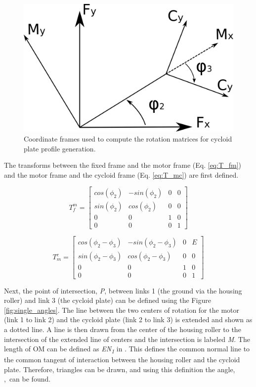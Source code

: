\begin{figure}[!b]
   \centering
   \includegraphics[width=0.50\linewidth]{fig/single_stage_frames}
   \caption{Coordinate frames used to compute the rotation matrices for cycloid plate profile generation.}
   \label{fig:single_frames}
\end{figure}

The transforms between the fixed frame and the motor frame (Eq. \ref{eq:T_fm}) and the motor frame and the cycloid frame (Eq. \ref{eq:T_mc}) are first defined. 

\begin{equation} \label{eq:T_fm}
T_f^m = \left[{\begin{array}{cccc}
		cos(\phi_2) & -sin(\phi_2) & 0 & 0\\
		sin(\phi_2) & cos(\phi_2) & 0 & 0\\
		0 & 0 & 1 & 0\\
		0 & 0 & 0 & 1 \end{array} } \right]
\end{equation}

\begin{equation} \label{eq:T_mc}
T_m^c = \left[{\begin{array}{cccc}
		cos(\phi_2 - \phi_3) & -sin(\phi_2 - \phi_3) & 0 & E\\
		sin(\phi_2 - \phi_3) & cos(\phi_2 - \phi_3) & 0 & 0\\
		0 & 0 & 1 & 0\\
		0 & 0 & 0 & 1 \end{array} } \right]
\end{equation}

Next, the point of intersection, \textit{P}, between links 1 (the ground via the housing roller) and link 3 (the cycloid plate) can be defined using the Figure \ref{fig:single_angles}. The line between the two centers of rotation for the motor (link 1 to link 2) and the cycloid plate (link 2 to link 3) is extended and shown as a dotted line. A line is then drawn from the center of the housing roller to the intersection of the extended line of centers and the intersection is labeled \textit{M}. The length of OM can be defined as \textit{EN\textsubscript{1}} in \cite{ref:on_the_lobe}. This defines the common normal line to the common tangent of interaction between the housing roller and the cycloid plate. Therefore, triangles can be drawn, and using this definition the angle, \textpsi,\ can be found. 

